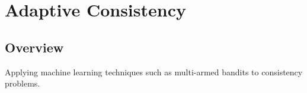 
\renewcommand{\thechapter}{4}

\chapter{Adaptive Consistency}

\section{Overview}

Applying machine learning techniques such as multi-armed bandits to consistency problems.
